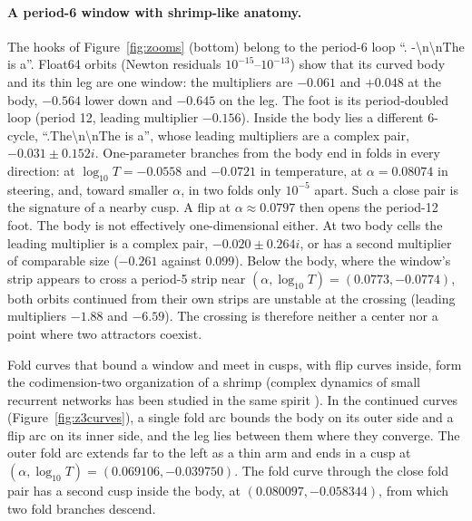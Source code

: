 \documentclass[11pt,letterpaper]{article}
\begin{document}
\paragraph{A period-6 window with shrimp-like anatomy.} The hooks of Figure~\ref{fig:zooms} (bottom) belong to
the period-6 loop ``. -\textbackslash n\textbackslash nThe is a''. Float64 orbits (Newton residuals
$10^{-15}$--$10^{-13}$) show that its curved body and its thin leg are one window: the multipliers are $-0.061$ and
$+0.048$ at the body, $-0.564$ lower down and $-0.645$ on the leg. The foot is its period-doubled loop (period 12,
leading multiplier $-0.156$). Inside the body lies a different 6-cycle, ``.The\textbackslash n\textbackslash nThe is
a'', whose leading multipliers are a complex pair, $-0.031\pm0.152i$. One-parameter branches from the body end in
folds in every direction: at $\log_{10}T=-0.0558$ and $-0.0721$ in temperature, at $\alpha=0.08074$ in steering, and,
toward smaller $\alpha$, in two folds only $10^{-5}$ apart. Such a close pair is the signature of a nearby cusp. A
flip at $\alpha\approx0.0797$ then opens the period-12 foot. The body is not effectively one-dimensional either. At two body cells the leading
multiplier is a complex pair, $-0.020\pm0.264i$, or has a second multiplier of comparable size ($-0.261$ against
$0.099$). Below the body, where the window's strip appears to cross a period-5 strip near
$(\alpha,\log_{10}T)=(0.0773,-0.0774)$, both orbits continued from their own strips are unstable at the crossing
(leading multipliers $-1.88$ and $-6.59$). The crossing is therefore neither a center nor a point where two attractors
coexist.

Fold curves that bound a window and meet in cusps, with flip curves inside, form the codimension-two organization of
a shrimp \cite{facanha2013endoskeletons} (complex dynamics of small recurrent networks has been studied in the same
spirit \cite{pasemann2002complex}). In the continued curves (Figure~\ref{fig:z3curves}), a single fold arc bounds the
body on its outer side and a flip arc on its inner side, and the leg lies between them where they converge. The outer
fold arc extends far to the left as a thin arm and ends in a cusp at $(\alpha,\log_{10}T)=(0.069106,-0.039750)$.
The fold curve through the close fold pair has a second cusp inside the body, at $(0.080097,-0.058344)$, from
which two fold branches descend.
\end{document}
